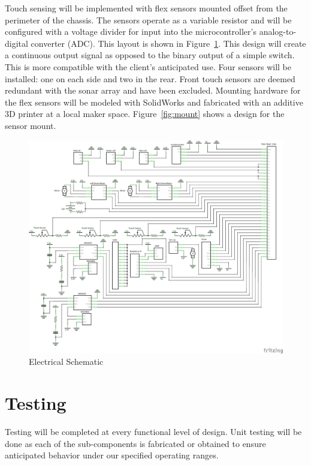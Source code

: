 \documentclass{article}
\begin{document}
    Touch sensing will be implemented with flex sensors mounted offset
    from the perimeter of the chassis.
    The sensors operate as a variable resistor
    and will be configured with a voltage divider for input
    into the microcontroller's analog-to-digital converter (ADC).
    This layout is shown in  Figure~\ref{fig:schematic}.
    This design will create a continuous output signal
    as opposed to the binary output of a simple switch.
    This is more compatible with the client's anticipated use.
    Four sensors will be installed: one on each side and two in the rear.
    Front touch sensors are deemed redundant with the sonar array
    and have been excluded.
    Mounting hardware for the flex sensors will be modeled
    with SolidWorks and fabricated with an additive 3D printer
    at a local maker space.
    Figure~\ref{fig:mount} shows a design for the sensor mount.

    \begin{figure}
        \centering
        \includegraphics[width=\textwidth]{schematic.png}
        \caption{Electrical Schematic}
        \label{fig:schematic}
    \end{figure}
    
\FloatBarrier
\section{Testing} %
    \label{sec:testing}
    
    Testing will be completed at every functional level of design.
    Unit testing will be done as each of the sub-components
    is fabricated or obtained to ensure anticipated behavior
    under our specified operating ranges.
    
\end{document}
